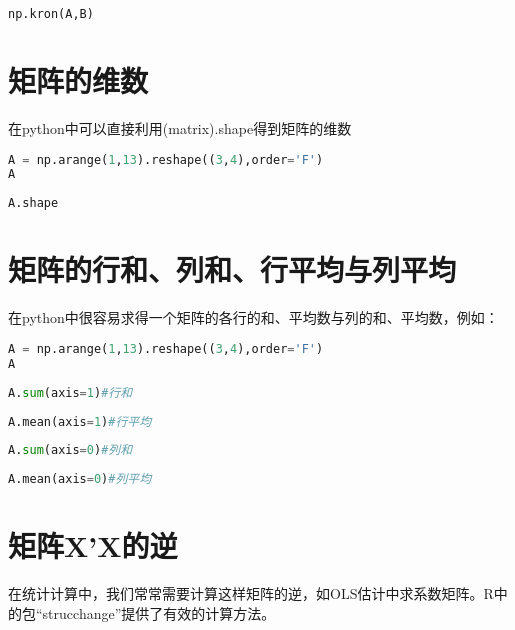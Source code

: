 \documentclass[UTF8,a4paper,12pt]{ctexart}  %
\begin{document}
\begin{lstlisting}[language=Python]
np.kron(A,B)
\end{lstlisting}

\section{矩阵的维数}

在python中可以直接利用(matrix).shape得到矩阵的维数

\begin{lstlisting}[language=Python]
A = np.arange(1,13).reshape((3,4),order='F')
A
\end{lstlisting}

\begin{lstlisting}[language=Python]
A.shape
\end{lstlisting}

\section{矩阵的行和、列和、行平均与列平均}

在python中很容易求得一个矩阵的各行的和、平均数与列的和、平均数，例如：

\begin{lstlisting}[language=Python]
A = np.arange(1,13).reshape((3,4),order='F')
A
\end{lstlisting}

\begin{lstlisting}[language=Python]
A.sum(axis=1)#行和
\end{lstlisting}

\begin{lstlisting}[language=Python]
A.mean(axis=1)#行平均
\end{lstlisting}

\begin{lstlisting}[language=Python]
A.sum(axis=0)#列和
\end{lstlisting}

\begin{lstlisting}[language=Python]
A.mean(axis=0)#列平均
\end{lstlisting}

\hypertarget{xx}{%
\section{矩阵X'X的逆}\label{xx}}

在统计计算中，我们常常需要计算这样矩阵的逆，如OLS估计中求系数矩阵。R中的包``strucchange''提供了有效的计算方法。
\end{document}
